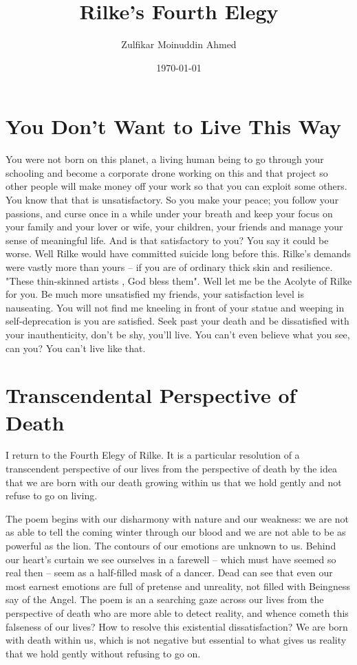 \documentclass{amsart}
\title{Rilke's Fourth Elegy}
\author{Zulfikar Moinuddin Ahmed}
\date{\today}
\begin{document}
\maketitle

\section{You Don't Want to Live This Way}

You were not born on this planet, a living human being to go through your schooling and become a corporate drone working on this and that project so other people will make money off your work so that you can exploit some others.  You know that that is unsatisfactory.  So you make your peace; you follow your passions, and curse once in a while under your breath and keep your focus on your family and your lover or wife, your children, your friends and manage your sense of meaningful life.  And is that satisfactory to you?  You say it could be worse.  Well Rilke would have committed suicide long before this.  Rilke's demands were vastly more than yours -- if you are of ordinary thick skin and resilience.  "These thin-skinned artists , God bless them".  Well let me be the Acolyte of Rilke for you.  Be much more unsatisfied my friends, your satisfaction level is nauseating.  You will not find me kneeling in front of your statue and weeping in self-deprecation is you are satisfied.  Seek past your death and be dissatisfied with your inauthenticity, don't be shy, you'll live.  You can't even believe what you see, can you?  You can't live like that.  

\section{Transcendental Perspective of Death}

I return to the Fourth Elegy of Rilke.  It is a particular resolution of a transcendent perspective of our lives from the perspective of death by the idea that we are born with our death growing within us that we hold gently and not refuse to go on living.

The poem begins with our disharmony with nature and our weakness: we are not as able to tell the coming winter through our blood and we are not able to be as powerful as the lion. The contours of our emotions are unknown to us. Behind our heart's curtain we see ourselves in a farewell -- which must have seemed so real then -- seem as a half-filled mask of a dancer.  Dead can see that even our most earnest emotions are full of pretense and unreality, not filled with Beingness say of the Angel.  The poem is an a searching gaze across our lives from the perspective of death who are more able to detect reality, and whence cometh this falseness of our lives?  How to resolve this existential dissatisfaction?  We are born with death within us, which is not negative but essential to what gives us reality that we hold gently without refusing to go on.
\end{document}

